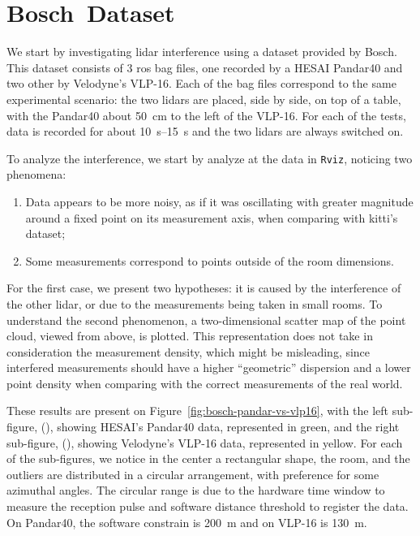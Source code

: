 

\section{Bosch\cp~Dataset}
We start by investigating \ac{lidar} interference using a dataset provided by Bosch. This dataset consists of 3 \ac{ros} bag files, one recorded by a HESAI Pandar40 and two other by Velodyne's VLP-16. Each of the bag files correspond to the same experimental scenario: the two \acp{lidar} are placed, side by side, on top of a table, with the Pandar40 about \SI{50}{\centi\meter} to the left of the VLP-16. For each of the tests, data is recorded for about \SIrange{10}{15}{\second} and the two \acp{lidar} are always switched on.

To analyze the interference, we start by analyze at the data in \texttt{Rviz}, noticing two phenomena: 

\begin{enumerate}
\item Data appears to be more noisy, as if it was oscillating with greater magnitude around a fixed point on its measurement axis, when comparing with \ac{kitti}'s dataset;
\item Some measurements correspond to points outside of the room dimensions.
\end{enumerate}

For the first case, we present two hypotheses: it is caused by the interference of the other \ac{lidar}, or due to the measurements being taken in small rooms. To understand the second phenomenon, a two-dimensional scatter map of the point cloud, viewed from above, is plotted. This representation does not take in consideration the measurement density, which might be misleading, since interfered measurements should have a higher ``geometric'' dispersion and a lower point density when comparing with the correct measurements of the real world.

These results are present on Figure~\ref{fig:bosch-pandar-vs-vlp16}, with the left sub-figure, (), showing HESAI's Pandar40 data, represented in green, and the right sub-figure, (), showing Velodyne's VLP-16 data, represented in yellow. For each of the sub-figures, we notice in the center a rectangular shape, the room, and the outliers are distributed in a circular arrangement, with preference for some azimuthal angles. The circular range is due to the hardware time window to measure the reception pulse and software distance threshold to register the data. On Pandar40, the software constrain is \SI{200}{\meter} and on VLP-16 is \SI{130}{\meter}. 

